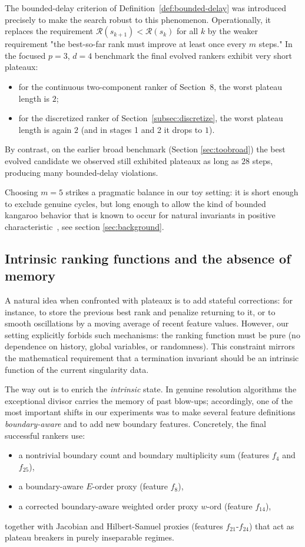 \documentclass[11pt]{amsart}
\begin{document}
The bounded-delay criterion of Definition~\ref{def:bounded-delay} was introduced precisely to
make the search robust to this phenomenon.
Operationally, it replaces the requirement $\mathcal R(s_{k+1})<\mathcal R(s_k)$ for all $k$
by the weaker requirement "the best-so-far rank must improve at least once every $m$ steps."
In the focused $p=3$, $d=4$ benchmark the final evolved rankers exhibit very short plateaux:
\begin{itemize}[leftmargin=*]
\item for the continuous two-component ranker of Section~8, the worst plateau length is $2$;
\item for the discretized ranker of Section~\ref{subsec:discretize}, the worst plateau length is again $2$
(and in stages 1 and 2 it drops to $1$).
\end{itemize}
By contrast, on the earlier broad benchmark (Section \ref{sec:toobroad}) the best evolved candidate we
observed still exhibited plateaux as long as $28$ steps, producing many bounded-delay violations.

Choosing $m=5$ strikes a pragmatic balance in our toy setting: it is short enough to
exclude genuine cycles, but long enough to allow the kind of bounded kangaroo behavior that is
known to occur for natural invariants in positive characteristic~\cite{Hauser2008}, see section \ref{sec:background}.

\subsection{Intrinsic ranking functions and the absence of memory}
A natural idea when confronted with plateaux is to add stateful corrections:
for instance, to store the previous best rank and penalize returning to it, or to smooth oscillations
by a moving average of recent feature values.
However, our setting explicitly forbids such mechanisms: the ranking function must be pure
(no dependence on history, global variables, or randomness).
This constraint mirrors the mathematical requirement that a termination invariant should be an
intrinsic function of the current singularity data.

The way out is to enrich the \emph{intrinsic} state.
In genuine resolution algorithms the exceptional divisor carries the memory of past blow-ups;
accordingly, one of the most important shifts in our experiments was to make several feature
definitions \emph{boundary-aware} and to add new boundary features.
Concretely, the final successful rankers use:
\begin{itemize}[leftmargin=*]
\item a nontrivial boundary count and boundary multiplicity sum (features $f_4$ and $f_{25}$),
\item a boundary-aware $E$-order proxy (feature $f_8$),
\item a corrected boundary-aware weighted order proxy $w$-ord (feature $f_{14}$),
\end{itemize}
together with Jacobian and Hilbert-Samuel proxies (features $f_{21}$-$f_{24}$) that act as
plateau breakers in purely inseparable regimes.
\end{document}
